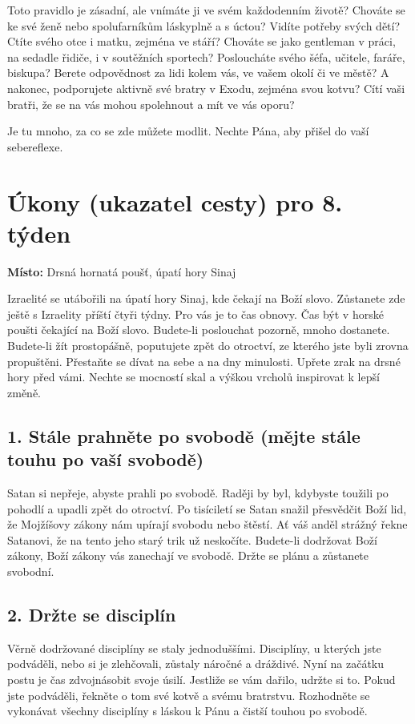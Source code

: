 \documentclass[11pt]{article}
\begin{document}
Toto pravidlo je zásadní, ale vnímáte ji ve svém každodenním životě? Chováte se ke své ženě nebo spolufarníkům
láskyplně a s úctou? Vidíte potřeby svých dětí? Ctíte svého otce i matku, zejména ve stáří? Chováte se jako gentleman
v práci, na sedadle řidiče, i v soutěžních sportech? Posloucháte svého šéfa, učitele, faráře, biskupa? Berete odpovědnost
za lidi kolem vás, ve vašem okolí či ve městě? A nakonec, podporujete aktivně své bratry v Exodu, zejména svou kotvu?
Cítí vaši bratři, že se na vás mohou spolehnout a mít ve vás oporu?

Je tu mnoho, za co se zde můžete modlit. Nechte Pána, aby přišel do vaší sebereflexe.

\newpage
\section*{Úkony (ukazatel cesty) pro 8. týden}

\textbf{Místo:} Drsná hornatá poušť, úpatí hory Sinaj

Izraelité se utábořili na úpatí hory Sinaj, kde čekají na Boží slovo. Zůstanete zde ještě s Izraelity příští čtyři
týdny. Pro vás je to čas obnovy. Čas být v horské poušti čekající na Boží slovo. Budete-li poslouchat pozorně,
mnoho dostanete. Budete-li žít prostopášně, poputujete zpět do otroctví, ze kterého jste byli zrovna
propuštěni. Přestaňte se dívat na sebe a na dny minulosti. Upřete zrak na drsné hory před vámi. Nechte se
mocností skal a výškou vrcholů inspirovat k lepší změně.

\subsection*{1. Stále prahněte po svobodě (mějte stále touhu po vaší svobodě)}
Satan si nepřeje, abyste prahli po svobodě. Raději by byl, kdybyste toužili po pohodlí a upadli zpět do otroctví. Po tisíciletí se Satan snažil přesvědčit Boží lid, že Mojžíšovy zákony nám upírají svobodu nebo štěstí. Ať váš anděl strážný řekne Satanovi, že na tento jeho starý trik už neskočíte. Budete-li dodržovat Boží zákony, Boží zákony vás zanechají ve svobodě. Držte se plánu a zůstanete svobodní.
\subsection*{2. Držte se disciplín}
Věrně dodržované disciplíny se staly jednoduššími. Disciplíny, u kterých jste podváděli, nebo si je zlehčovali, zůstaly náročné a dráždivé. Nyní na začátku postu je čas zdvojnásobit svoje úsilí. Jestliže se vám dařilo, udržte si to. Pokud jste podváděli, řekněte o tom své kotvě a svému bratrstvu. Rozhodněte se vykonávat všechny disciplíny s láskou k Pánu a čistší touhou po svobodě.
\end{document}
